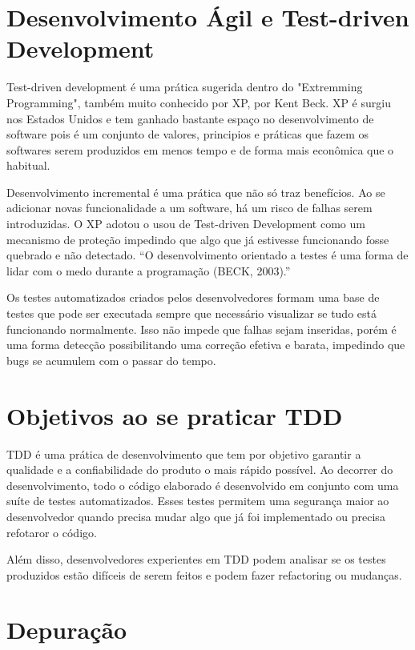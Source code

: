 \documentclass[12pt]{article}
\begin{document}
  \section{Desenvolvimento Ágil e Test-driven Development}

  Test-driven development é uma prática sugerida dentro do "Extremming 
  Programming", também muito conhecido por XP, por Kent Beck. XP é surgiu nos
  Estados Unidos e tem ganhado bastante espaço no desenvolvimento de software
  pois é um conjunto de valores, principios e práticas que fazem os softwares 
  serem produzidos em menos tempo e de forma mais econômica que o habitual.

  Desenvolvimento incremental é uma prática que não só traz benefícios. Ao se
  adicionar novas funcionalidade a um software, há um risco de falhas serem 
  introduzidas. O XP adotou o usou de Test-driven Development como um mecanismo
  de proteção impedindo que algo que já estivesse funcionando fosse quebrado
  e não detectado. “O desenvolvimento orientado a testes é uma forma de lidar 
  com o medo durante a programação (BECK, 2003).”

  Os testes automatizados criados pelos desenvolvedores formam uma base de 
  testes que pode ser executada sempre que necessário visualizar se tudo está
  funcionando normalmente. Isso não impede que falhas sejam inseridas, porém
  é uma forma detecção possibilitando uma correção efetiva e barata, impedindo
  que bugs se acumulem com o passar do tempo.

  \section{Objetivos ao se praticar TDD}

  TDD é uma prática de desenvolvimento que tem por objetivo garantir a
  qualidade e a confiabilidade do produto o mais rápido possível. Ao decorrer do
  desenvolvimento, todo o código elaborado é desenvolvido em conjunto com uma
  suíte de testes automatizados. Esses testes permitem uma segurança maior ao
  desenvolvedor quando precisa mudar algo que já foi implementado ou precisa 
  refotaror o código.

  Além disso, desenvolvedores experientes em TDD podem analisar se os testes 
  produzidos estão difíceis de serem feitos e podem fazer refactoring ou 
  mudanças.

  \section{Depuração}
\end{document}
